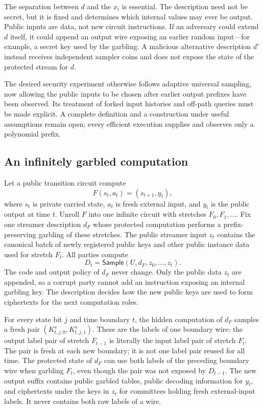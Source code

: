 The separation between $d$ and the $x_i$ is essential. The description need
not be secret, but it is fixed and determines which internal values may ever
be output. Public inputs are data, not new circuit instructions. If an
adversary could extend $d$ itself, it could append an output wire exposing an
earlier random input---for example, a secret key used by the garbling. A
malicious alternative description $d'$ instead receives independent sampler
coins and does not expose the state of the protected stream for $d$.

The desired security experiment otherwise follows adaptive universal
sampling, now allowing the public inputs to be chosen after earlier output
prefixes have been observed. Its treatment of forked input histories and
off-path queries must be made explicit. A complete definition and a
construction under useful assumptions remain open; every efficient execution
supplies and observes only a polynomial prefix.

\subsection{An infinitely garbled computation}

Let a public transition circuit compute
\[
  F(s_t,a_t)=(s_{t+1},y_t),
\]
where $s_t$ is private carried state, $a_t$ is fresh external input, and
$y_t$ is the public output at time $t$. Unroll $F$ into one infinite circuit
with stretches $F_0,F_1,\ldots$. Fix one streamer description $d_F$ whose
protected computation performs a prefix-preserving garbling of these
stretches. The public streamer input $z_t$ contains the canonical batch of
newly registered public keys and other public instance data used for stretch
$F_t$. All parties compute
\[
  D_t=\mathsf{Sample}(U,d_F,z_0,\ldots,z_t).
\]
The code and output policy of $d_F$ never change. Only the public data $z_t$
are appended, so a corrupt party cannot add an instruction exposing an
internal garbling key. The description decides how the new public keys are
used to form ciphertexts for the next computation roles.

For every state bit $j$ and time boundary $t$, the hidden computation of $d_F$
samples a fresh pair
$(K^{s}_{t,j,0},K^{s}_{t,j,1})$. These are the labels of one boundary wire:
the output label pair of stretch $F_{t-1}$ is literally the input label pair
of stretch $F_t$. The pair is fresh at each new boundary; it is not one label
pair reused for all time. The protected state of $d_F$ can use both labels of
the preceding boundary wire when garbling $F_t$, even though the pair was not
exposed by $D_{t-1}$. The new output suffix contains public garbled tables,
public decoding information for $y_t$, and ciphertexts under the keys in
$z_t$ for committees holding fresh external-input labels. It never contains
both raw labels of a wire.

